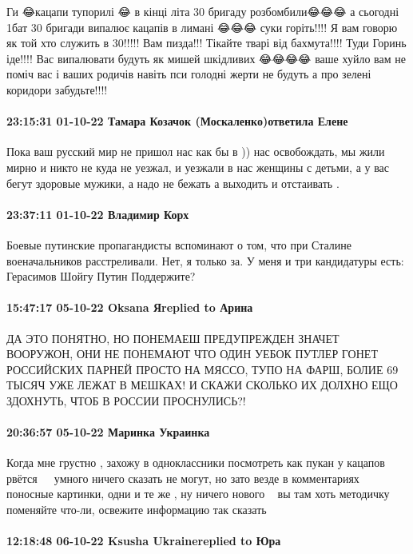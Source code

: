 Ги 😂кацапи тупорилі 😂 в кінці літа 30 бригаду розбомбили😂😂😂 а сьогодні
1бат 30 бригади випалює кацапів в лимані 😂😂😂 суки горіть!!!! Я вам говорю як
той хто служить в 30!!!!! Вам пизда!!! Тікайте тварі від бахмута!!!! Туди
Горинь іде!!!! Вас випалювати будуть як мишей шкідливих 😂😂😂😂 ваше хуйло вам
не поміч вас і ваших родичів навіть пси голодні жерти не будуть а про зелені
коридори забудьте!!!!

\paragraph{23:15:31 01-10-22 Тамара Козачок (Москаленко)ответила Елене}

Пока ваш русский мир не пришол нас как бы в )) нас освобождать, мы жили мирно и
никто не куда не уезжал, и уезжали в нас женщины с детьми, а у вас бегут
здоровые мужики, а надо не бежать а выходить и отстаивать .

\paragraph{23:37:11 01-10-22 Владимир Корх}

Боевые путинские пропагандисты вспоминают о том, что при Сталине военачальников расстреливали.
Нет, я только за.
У меня и три кандидатуры есть:
Герасимов
Шойгу
Путин
Поддержите?

\paragraph{15:47:17 05-10-22 Oksana Яreplied to Арина}

ДА ЭТО ПОНЯТНО, НО ПОНЕМАЕШ ПРЕДУПРЕЖДЕН ЗНАЧЕТ ВООРУЖОН, ОНИ НЕ ПОНЕМАЮТ ЧТО
ОДИН УЕБОК ПУТЛЕР ГОНЕТ РОССИЙСКИХ ПАРНЕЙ ПРОСТО НА МЯССО, ТУПО НА ФАРШ, БОЛИЕ
69 ТЫСЯЧ УЖЕ ЛЕЖАТ В МЕШКАХ! И СКАЖИ СКОЛЬКО ИХ ДОЛХНО ЕЩО ЗДОХНУТЬ, ЧТОБ В
РОССИИ ПРОСНУЛИСЬ?!

\paragraph{20:36:57 05-10-22 Маринка Украинка}

Когда мне грустно , захожу в одноклассники посмотреть как пукан у кацапов
рвётся 🤣🤣🤣 умного ничего сказать не могут, но зато везде в комментариях
поносные картинки, одни и те же , ну ничего нового🤣🤣🤣 вы там хоть методичку
поменяйте что-ли, освежите информацию так сказать 🤣🤣🤣🤣🤣🤣

\paragraph{12:18:48 06-10-22 Ksusha Ukrainereplied to Юра}


